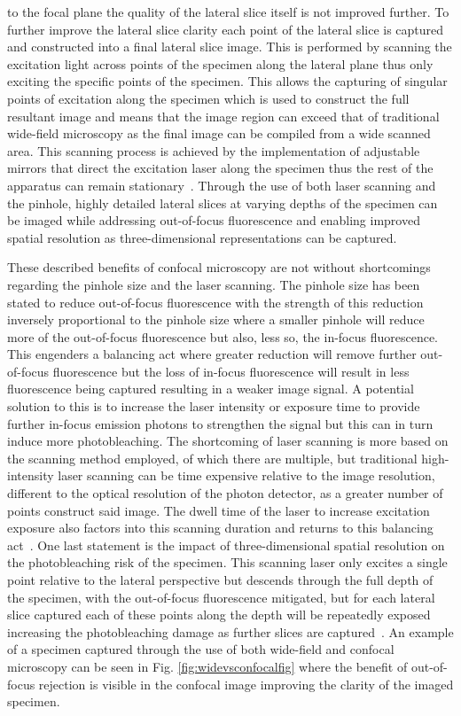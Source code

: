 to the focal plane the quality of the lateral slice itself is not improved further. To further improve the lateral slice clarity each point of the lateral slice is captured and constructed into a final lateral slice image. This is performed by scanning the excitation light across points of the specimen along the lateral plane thus only exciting the specific points of the specimen. This allows the capturing of singular points of excitation along the specimen which is used to construct the full resultant image and means that the image region can exceed that of traditional wide-field microscopy as the final image can be compiled from a wide scanned area. This scanning process is achieved by the implementation of adjustable mirrors that direct the excitation laser along the specimen thus the rest of the apparatus can remain stationary~\cite{Sanderson-2014, Confocal-2005}. Through the use of both laser scanning and the pinhole, highly detailed lateral slices at varying depths of the specimen can be imaged while addressing out-of-focus fluorescence and enabling improved spatial resolution as three-dimensional representations can be captured.\par These described benefits of confocal microscopy are not without shortcomings regarding the pinhole size and the laser scanning. The pinhole size has been stated to reduce out-of-focus fluorescence with the strength of this reduction inversely proportional to the pinhole size where a smaller pinhole will reduce more of the out-of-focus fluorescence but also, less so, the in-focus fluorescence. This engenders a balancing act where greater reduction will remove further out-of-focus fluorescence but the loss of in-focus fluorescence will result in less fluorescence being captured resulting in a weaker image signal. A potential solution to this is to increase the laser intensity or exposure time to provide further in-focus emission photons to strengthen the signal but this can in turn induce more photobleaching. The shortcoming of laser scanning is more based on the scanning method employed, of which there are multiple, but traditional high-intensity laser scanning can be time expensive relative to the image resolution, different to the optical resolution of the photon detector, as a greater number of points construct said image. The dwell time of the laser to increase excitation exposure also factors into this scanning duration and returns to this balancing act~\cite{Sanderson-2014}. One last statement is the impact of three-dimensional spatial resolution on the photobleaching risk of the specimen. This scanning laser only excites a single point relative to the lateral perspective but descends through the full depth of the specimen, with the out-of-focus fluorescence mitigated, but for each lateral slice captured each of these points along the depth will be repeatedly exposed increasing the photobleaching damage as further slices are captured~\cite{Sanderson-2014}. An example of a specimen captured through the use of both wide-field and confocal microscopy can be seen in Fig. \ref{fig:widevsconfocalfig} where the benefit of out-of-focus rejection is visible in the confocal image improving the clarity of the imaged specimen.
